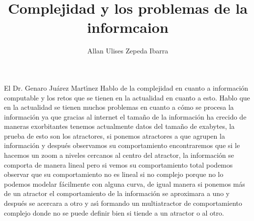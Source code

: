 \documentclass[a4paper,10pt]{article}
\title{Complejidad y los problemas de la informcaion}
\author{Allan Ulises Zepeda Ibarra}
\begin{document}
\maketitle

El Dr. Genaro Ju\'arez Mart\'{\i}nez Hablo de la complejidad en cuanto a informaci\'on computable y los retos que se tienen en la actualidad en cuanto a 
esto. Hablo que en la actualidad se tienen muchos problemas en cuanto a c\'omo se procesa la informaci\'on ya que gracias al internet el 
tama\~no de la informaci\'on ha crecido de maneras exorbitantes tenemos actualmente datos del tama\~no de exabytes, la prueba de esto son los 
atractores, si ponemos atractores a que agrupen la informaci\'on y despu\'es observamos su comportamiento encontraremos que si le hacemos un 
zoom a niveles cercanos al centro del atractor, la informaci\'on se comporta de manera lineal pero si vemos su comportamiento total 
podemos observar que su comportamiento no es lineal si no complejo porque no lo podemos modelar f\'acilmente con alguna curva, de igual 
manera si ponemos m\'as de un atractor el comportamiento de la informaci\'on se aproximara a uno y despu\'es se acercara a otro y as\'{\i} formando 
un multiatractor de comportamiento complejo donde no se puede definir bien si tiende a un atractor o al otro.
\end{document}
